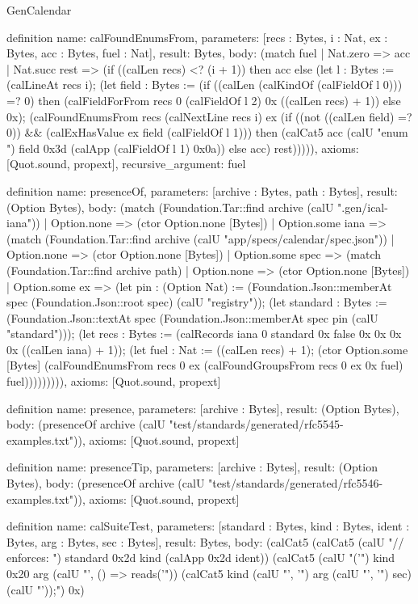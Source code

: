 \begin{lexlean}{GenCalendar}
\begin{semanticmodule}
definition{
  name: calFoundEnumsFrom,
  parameters: [recs : Bytes, i : Nat, ex : Bytes, acc : Bytes, fuel : Nat],
  result: Bytes,
  body: (match fuel
    | Nat.zero => acc
    | Nat.succ rest => (if ((calLen recs) <? (i + 1)) then acc else (let l : Bytes := (calLineAt recs i); (let field : Bytes := (if ((calLen (calKindOf (calFieldOf l 0))) =? 0) then (calFieldForFrom recs 0 (calFieldOf l 2) 0x ((calLen recs) + 1)) else 0x); (calFoundEnumsFrom recs (calNextLine recs i) ex (if ((not ((calLen field) =? 0)) && (calExHasValue ex field (calFieldOf l 1))) then (calCat5 acc (calU "enum ") field 0x3d (calApp (calFieldOf l 1) 0x0a)) else acc) rest))))),
  axioms: [Quot.sound, propext],
  recursive_argument: fuel
}

definition{
  name: presenceOf,
  parameters: [archive : Bytes, path : Bytes],
  result: (Option Bytes),
  body: (match (Foundation.Tar::find archive (calU ".gen/ical-iana"))
    | Option.none => (ctor Option.none [Bytes])
    | Option.some iana => (match (Foundation.Tar::find archive (calU "app/specs/calendar/spec.json"))
      | Option.none => (ctor Option.none [Bytes])
      | Option.some spec => (match (Foundation.Tar::find archive path)
        | Option.none => (ctor Option.none [Bytes])
        | Option.some ex => (let pin : (Option Nat) := (Foundation.Json::memberAt spec (Foundation.Json::root spec) (calU "registry")); (let standard : Bytes := (Foundation.Json::textAt spec (Foundation.Json::memberAt spec pin (calU "standard"))); (let recs : Bytes := (calRecords iana 0 standard 0x false 0x 0x 0x 0x ((calLen iana) + 1)); (let fuel : Nat := ((calLen recs) + 1); (ctor Option.some [Bytes] (calFoundEnumsFrom recs 0 ex (calFoundGroupsFrom recs 0 ex 0x fuel) fuel))))))))),
  axioms: [Quot.sound, propext]
}

definition{
  name: presence,
  parameters: [archive : Bytes],
  result: (Option Bytes),
  body: (presenceOf archive (calU "test/standards/generated/rfc5545-examples.txt")),
  axioms: [Quot.sound, propext]
}

definition{
  name: presenceTip,
  parameters: [archive : Bytes],
  result: (Option Bytes),
  body: (presenceOf archive (calU "test/standards/generated/rfc5546-examples.txt")),
  axioms: [Quot.sound, propext]
}

definition{
  name: calSuiteTest,
  parameters: [standard : Bytes, kind : Bytes, ident : Bytes, arg : Bytes, sec : Bytes],
  result: Bytes,
  body: (calCat5 (calCat5 (calU "// enforces: ") standard 0x2d kind (calApp 0x2d ident)) (calCat5 (calU "\ntest('") kind 0x20 arg (calU "', () => reads('")) (calCat5 kind (calU "', '") arg (calU "', '") sec) (calU "'));\n") 0x)
}


\end{semanticmodule}
\end{lexlean}
